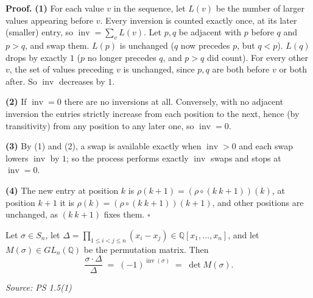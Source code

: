 \documentclass[11pt]{report}
\renewenvironment{proof}[1][Proof]{\noindent\textbf{#1.} }{\hfill$\square$\par\vspace{5pt}}
\newcommand{\srcline}[1]{\par\hfill{\footnotesize\textit{Source: #1}}}
\begin{document}
\begin{proof}
\textbf{(1)} For each value $v$ in the sequence, let $L(v)$ be the number of larger values appearing before $v$. Every inversion is counted exactly once, at its later (smaller) entry, so $\operatorname{inv} = \sum_v L(v)$. Let $p, q$ be adjacent with $p$ before $q$ and $p > q$, and swap them. $L(p)$ is unchanged ($q$ now precedes $p$, but $q < p$). $L(q)$ drops by exactly $1$ ($p$ no longer precedes $q$, and $p > q$ did count). For every other $v$, the set of values preceding $v$ is unchanged, since $p, q$ are both before $v$ or both after. So $\operatorname{inv}$ decreases by $1$.

\textbf{(2)} If $\operatorname{inv} = 0$ there are no inversions at all. Conversely, with no adjacent inversion the entries strictly increase from each position to the next, hence (by transitivity) from any position to any later one, so $\operatorname{inv} = 0$.

\textbf{(3)} By (1) and (2), a swap is available exactly when $\operatorname{inv} > 0$ and each swap lowers $\operatorname{inv}$ by $1$; so the process performs exactly $\operatorname{inv}$ swaps and stops at $\operatorname{inv} = 0$.

\textbf{(4)} The new entry at position $k$ is $\rho(k+1) = (\rho \circ (k\ k{+}1))(k)$, at position $k+1$ it is $\rho(k) = (\rho \circ (k\ k{+}1))(k+1)$, and other positions are unchanged, as $(k\ k{+}1)$ fixes them.
\end{proof}

\begin{thmbox}\label{thm:three-formulas-sign}
Let $\sigma \in S_n$, let $\Delta = \prod_{1 \leq i < j \leq n}(x_i - x_j) \in \mathbb{Q}[x_1, \ldots, x_n]$, and let $M(\sigma) \in GL_n(\mathbb{Q})$ be the permutation matrix. Then
\[ \frac{\sigma \cdot \Delta}{\Delta} \;=\; (-1)^{\operatorname{inv}(\sigma)} \;=\; \det M(\sigma). \]
\srcline{PS 1.5(1)}
\end{thmbox}
\end{document}
